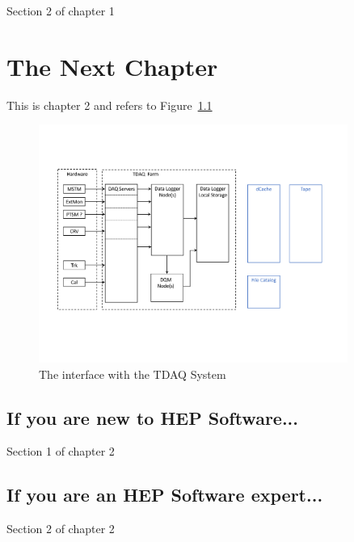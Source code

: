 Section 2 of chapter 1

\chapter{The Next Chapter}
\label{ch:next_chapter}

This is chapter 2 and refers to Figure~\ref{fig:interfaceTDAQ}

\begin{figure}[tbp]
\centering
\includegraphics[width=0.9\textwidth]{figures/interface_with_TDAQ.pdf}
\caption{The interface with the TDAQ System}
\label{fig:interfaceTDAQ}
\end{figure}


\section{If you are new to HEP Software...}

Section 1 of chapter 2


\section{If you are an HEP Software expert...}

Section 2 of chapter 2


